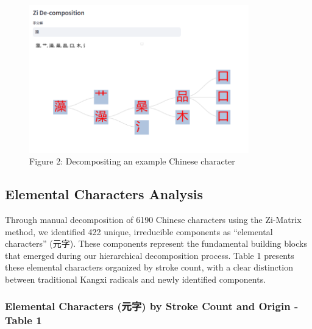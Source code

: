 \documentclass[
  11pt,
  letterpaper,
]{article}
\begin{document}
\begin{figure}
\centering
\includegraphics[width=0.85\textwidth]{./images/app_decomposing-zi.png}
\caption{Figure 2: Decompositing an example Chinese character}
\end{figure}

\subsection{Elemental Characters
Analysis}\label{elemental-characters-analysis}

Through manual decomposition of 6190 Chinese characters using the
Zi-Matrix method, we identified 422 unique, irreducible components as
``elemental characters'' (元字). These components represent the
fundamental building blocks that emerged during our hierarchical
decomposition process. Table 1 presents these elemental characters
organized by stroke count, with a clear distinction between traditional
Kangxi radicals and newly identified components.

\subsubsection{Elemental Characters (元字) by Stroke Count and Origin -
Table
1}\label{elemental-characters-ux5143ux5b57-by-stroke-count-and-origin---table-1}
\end{document}

